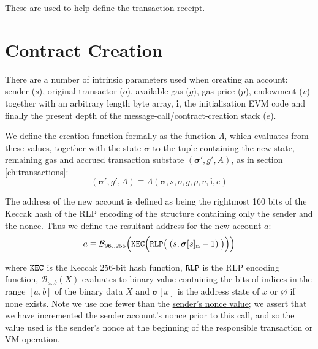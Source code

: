 \documentclass[9pt,oneside]{amsart}
\begin{document}
\begin{multicols}{2}
These are used to help define the \hyperlink{Transaction Receipt}{transaction receipt}.

\section{Contract Creation} \label{ch:create}

There are a number of intrinsic parameters used when creating an account: sender ($s$), original transactor ($o$), available gas ($g$), gas price ($p$), endowment ($v$) together with an arbitrary length byte array, $\mathbf{i}$, the initialisation EVM code and finally the present depth of the message-call/contract-creation stack ($e$).

We define the creation function formally as the function $\Lambda$, which evaluates from these values, together with the state $\boldsymbol{\sigma}$ to the tuple containing the new state, remaining gas and accrued transaction substate $(\boldsymbol{\sigma}', g', A)$, as in section \ref{ch:transactions}:
\begin{equation}
(\boldsymbol{\sigma}', g', A) \equiv \Lambda(\boldsymbol{\sigma}, s, o, g, p, v, \mathbf{i}, e)
\end{equation}

The address of the new account is defined as being the rightmost 160 bits of the Keccak hash of the RLP encoding of the structure containing only the sender and the \hyperlink{account nonce}{nonce}. Thus we define the resultant address for the new account $a$:
\begin{equation}
a \equiv \mathcal{B}_{96..255}\Big(\mathtt{\tiny KEC}\Big(\mathtt{\tiny RLP}\big(\;(s, \boldsymbol{\sigma}[s]_\mathbf{n} - 1)\;\big)\Big)\Big)
\end{equation}

where $\mathtt{\tiny KEC}$ is the Keccak 256-bit hash function, $\mathtt{\tiny RLP}$ is the RLP encoding function, $\mathcal{B}_{a..b}(X)$ evaluates to binary value containing the bits of indices in the range $[a, b]$ of the binary data $X$ and $\boldsymbol{\sigma}[x]$ is the address state of $x$ or $\varnothing$ if none exists. Note we use one fewer than the \hyperlink{account nonce}{sender's nonce value}; we assert that we have incremented the sender account's nonce prior to this call, and so the value used is the sender's nonce at the beginning of the responsible transaction or VM operation.


\end{multicols}
\end{document}
